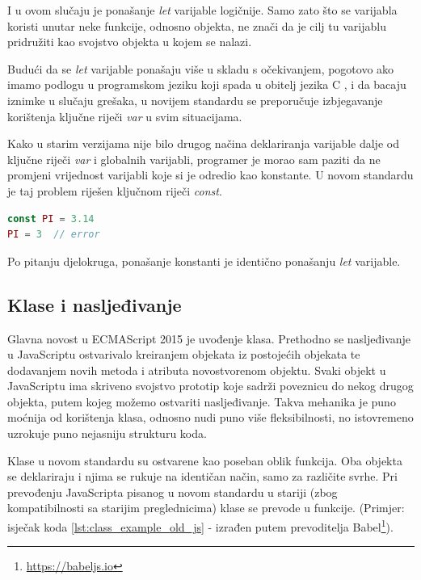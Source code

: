 \documentclass[times, utf8, zavrsni, numeric]{fer}
\newcommand{\razmakp}{\vspace{18pt}}
\newcommand{\razmaks}{\vspace{10pt}}
\begin{document}
I u ovom slučaju je ponašanje \emph{let} varijable logičnije. Samo zato što se varijabla koristi unutar neke funkcije, odnosno objekta, ne znači da je cilj tu varijablu pridružiti kao svojstvo objekta u kojem se nalazi.

\razmakp

Budući da se \emph{let} varijable ponašaju više u skladu s očekivanjem, pogotovo ako imamo podlogu u programskom jeziku koji spada u obitelj jezika C , i da bacaju iznimke u slučaju grešaka, u novijem standardu se preporučuje izbjegavanje korištenja ključne riječi \emph{var} u svim situacijama.

\razmakp
\razmakp

Kako u starim verzijama nije bilo drugog načina deklariranja varijable dalje od ključne riječi \emph{var} i globalnih varijabli, programer je morao sam paziti da ne promjeni vrijednost varijabli koje si je odredio kao konstante.
U novom standardu je taj problem riješen ključnom riječi \emph{const}\citep{MDNConst}.

\razmakp
\begin{lstlisting}[language=JavaScript, caption={Deklariranje konstante}]
const PI = 3.14
PI = 3  // error
\end{lstlisting}
\razmaks

Po pitanju djelokruga, ponašanje konstanti je identično ponašanju \emph{let} varijable.

\razmakp


\subsection{Klase i nasljeđivanje}

Glavna novost u ECMAScript 2015 je uvođenje klasa.
Prethodno se nasljeđivanje u JavaScriptu ostvarivalo kreiranjem objekata iz postojećih objekata te dodavanjem novih metoda i atributa novostvorenom objektu.
Svaki objekt u JavaScriptu ima skriveno svojstvo prototip  koje sadrži poveznicu do nekog drugog objekta, putem kojeg možemo ostvariti nasljeđivanje\citep{MDNPrototype}.
Takva mehanika je puno moćnija od korištenja klasa, odnosno nudi puno više fleksibilnosti, no istovremeno uzrokuje puno nejasniju strukturu koda.

Klase u novom standardu su ostvarene kao poseban oblik funkcija\citep{MDNClass}.
Oba objekta se deklariraju i njima se rukuje na identičan način, samo za različite svrhe.
Pri prevođenju JavaScripta pisanog u novom standardu u stariji (zbog kompatibilnosti sa starijim preglednicima) klase se prevode u funkcije.
(Primjer: isječak koda \ref{lst:class_example_old_js} - izrađen putem prevoditelja Babel\footnote{\url{https://babeljs.io}}).
\end{document}
